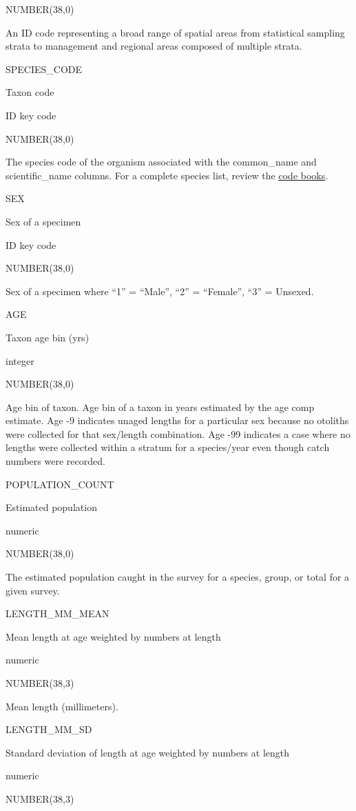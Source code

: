 \documentclass[
  letterpaper,
  oneside,
  open=any]{scrbook}
\begin{document}
NUMBER(38,0)

An ID code representing a broad range of spatial areas from statistical
sampling strata to management and regional areas composed of multiple
strata.

SPECIES\_CODE

Taxon code

ID key code

NUMBER(38,0)

The species code of the organism associated with the common\_name and
scientific\_name columns. For a complete species list, review the
\href{https://www.fisheries.noaa.gov/resource/document/groundfish-survey-species-code-manual-and-data-codes-manual}{code
books}.

SEX

Sex of a specimen

ID key code

NUMBER(38,0)

Sex of a specimen where ``1'' = ``Male'', ``2'' = ``Female'', ``3'' =
Unsexed.

AGE

Taxon age bin (yrs)

integer

NUMBER(38,0)

Age bin of taxon. Age bin of a taxon in years estimated by the age comp
estimate. Age -9 indicates unaged lengths for a particular sex because
no otoliths were collected for that sex/length combination. Age -99
indicates a case where no lengths were collected within a stratum for a
species/year even though catch numbers were recorded.

POPULATION\_COUNT

Estimated population

numeric

NUMBER(38,0)

The estimated population caught in the survey for a species, group, or
total for a given survey.

LENGTH\_MM\_MEAN

Mean length at age weighted by numbers at length

numeric

NUMBER(38,3)

Mean length (millimeters).

LENGTH\_MM\_SD

Standard deviation of length at age weighted by numbers at length

numeric

NUMBER(38,3)
\end{document}
